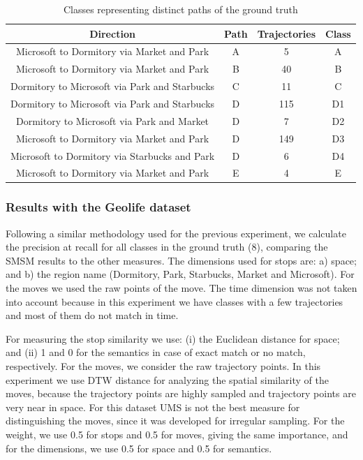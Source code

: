 \begin{table}[ht!]
\scriptsize
  \centering
  \begin{tabular}{|c|c|c|c|}
  \hline
 Direction & Path &  Trajectories & Class \\
  \hline
Microsoft to Dormitory via Market and Park& A & 5 & A \\
Microsoft to Dormitory via Market and Park& B & 40&B \\
Dormitory to Microsoft via Park and Starbucks& C & 11&C \\
Dormitory to Microsoft via Park and Starbucks& D & 115&D1 \\
Dormitory to Microsoft via Park and Market& D & 7&D2 \\
Microsoft to Dormitory via Market and Park& D & 149&D3 \\
Microsoft to Dormitory via Starbucks and Park& D & 6&D4 \\
Microsoft to Dormitory via Market and Park& E & 4& E \\
    \hline
  \end{tabular}
  \caption{Classes representing distinct paths of the ground truth}
  \label{tab:geolife_dataset}
\end{table}

\subsubsection{Results with the Geolife dataset}

Following a similar methodology used for the previous experiment, we calculate the precision at recall for all classes in the ground truth (8), comparing the SMSM results to the other measures. The dimensions used for stops are: a) space; and b) the region name (Dormitory, Park, Starbucks, Market and Microsoft). For the moves we used the raw points of the move. The time dimension was not taken into account because in this experiment we have classes with a few trajectories and most of them do not match in time.

For measuring the stop similarity we use: (i) the Euclidean distance for space; and (ii) 1 and 0 for the semantics in case of exact match or no match, respectively. For the moves,  we consider the raw trajectory points. In this experiment we use DTW distance for analyzing the spatial similarity of the moves, because the trajectory points are highly sampled {and trajectory points are very near in space}.
For this dataset UMS is not the best measure for distinguishing the moves{, since it was developed for irregular sampling}. For the weight, we use 0.5 for stops and 0.5 for moves, giving the same importance, and for the dimensions, we use 0.5 for space and 0.5 for semantics.

